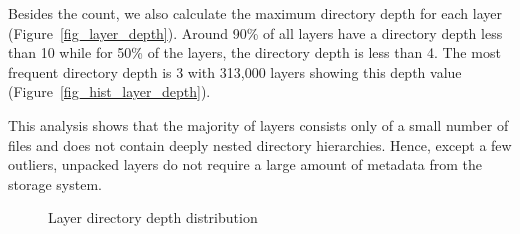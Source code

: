 
Besides the count, we also calculate the maximum directory depth for each layer
(Figure~\ref{fig_layer_depth}).
%
Around 90\% of all layers have a directory depth less than 10
while for 50\% of the layers, the directory depth is less than 4. 
%
The most frequent directory depth is 3 with 313,000 layers showing
this depth value (Figure~\ref{fig_hist_layer_depth}).
%
%

This analysis shows that the majority of layers consists only of a small number
of files and does not contain deeply nested directory hierarchies. Hence, except
a few outliers, unpacked layers do not require a large amount of metadata from the storage
system.

\begin{figure}[!t]
	\centering
	\caption{Layer directory depth distribution}
	\label{fig-layer-dir}
\end{figure}
